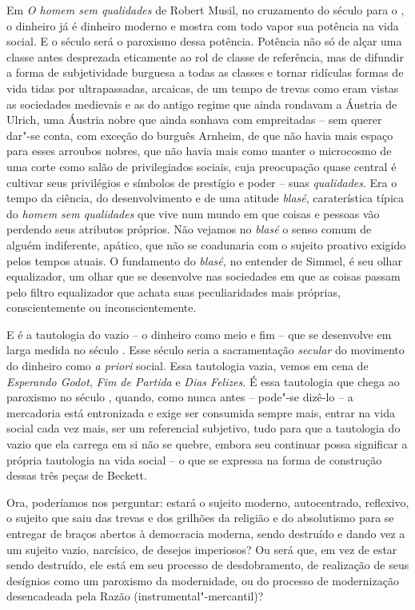 Em \emph{O homem sem qualidades} de Robert Musil, no cruzamento
do século  para o , o dinheiro já é dinheiro moderno e mostra com
todo vapor sua potência na vida social. E o século  será o paroxismo
dessa potência. Potência não só de alçar uma classe antes desprezada
eticamente ao rol de classe de referência, mas de difundir a forma de
subjetividade burguesa a todas as classes e tornar ridículas formas de
vida tidas por ultrapassadas, arcaicas, de um tempo de trevas como eram
vistas as sociedades medievais e as do antigo regime que ainda rondavam
a Áustria de Ulrich, uma Áustria nobre que ainda sonhava com empreitadas
-- sem querer dar"-se conta, com exceção do burguês Arnheim, de que não
havia mais espaço para esses arroubos nobres, que não havia mais como
manter o microcosmo de uma corte como salão de privilegiados sociais,
cuja preocupação quase central é cultivar seus privilégios e símbolos de
prestígio e poder -- suas \emph{qualidades}. Era o tempo da ciência, do
desenvolvimento e de uma atitude \emph{blasé},
caraterística típica do \emph{homem sem qualidades} que vive num mundo
em que coisas e pessoas vão perdendo seus atributos próprios. Não
vejamos no \emph{blasé} o senso comum de alguém indiferente, apático,
que não se coadunaria com o sujeito proativo exigido pelos tempos
atuais. O fundamento do \emph{blasé,} no entender de Simmel, é seu olhar
equalizador, um olhar que se desenvolve nas sociedades em que as coisas
passam pelo filtro equalizador que achata suas peculiaridades mais
próprias, conscientemente ou inconscientemente.

E é a tautologia do vazio -- o dinheiro como meio e fim -- que se
desenvolve em larga medida no século . Esse século seria a
sacramentação \emph{secular} do movimento do dinheiro como \emph{a
priori} social. Essa tautologia vazia, vemos em cena de \emph{Esperando
Godot}, \emph{Fim de Partida} e \emph{Dias Felizes}.
É essa tautologia que chega ao paroxismo no século
, quando, como nunca antes -- pode"-se dizê-lo -- a mercadoria está
entronizada e exige ser consumida sempre mais, entrar na vida social
cada vez mais, ser um referencial subjetivo, tudo para que a tautologia
do vazio que ela carrega em si não se quebre, embora seu continuar possa
significar a própria tautologia na vida social -- o que se expressa na
forma de construção dessas três peças de Beckett.

Ora, poderíamos nos perguntar: estará o sujeito moderno, autocentrado,
reflexivo, o sujeito que saiu das trevas e dos grilhões da religião e do
absolutismo para se entregar de braços abertos à democracia moderna,
sendo destruído e dando vez a um sujeito vazio, narcísico, de desejos
imperiosos? Ou será que, em vez de estar sendo destruído, ele está em
seu processo de desdobramento, de realização de seus desígnios como um
paroxismo da modernidade, ou do processo de modernização desencadeada
pela Razão (instrumental"-mercantil)?

